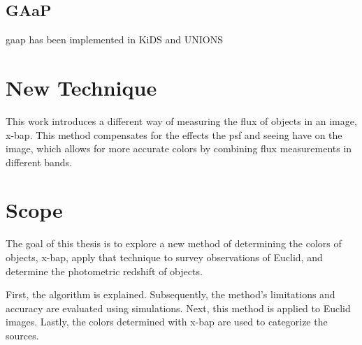 
\subsection{GAaP}\gls{gaap} has been implemented in KiDS and UNIONS
\cite{Kuijken_2008}

\section{New Technique}
This work introduces a different way of measuring the flux of objects in an image, \gls{x-bap}. This method compensates for the effects the \gls{psf} and seeing have on the image, which allows for more accurate colors by combining flux measurements in different bands.  


\section{Scope}

The goal of this thesis is to explore a new method of determining the colors of objects, \gls{x-bap}, apply that technique to survey observations of Euclid, and determine the photometric redshift of objects. 

First, the algorithm is explained. Subsequently, the method's limitations and accuracy are evaluated using simulations. Next, this method is applied to Euclid images. Lastly, the colors determined with \gls{x-bap} are used to categorize the sources. 
\newpage